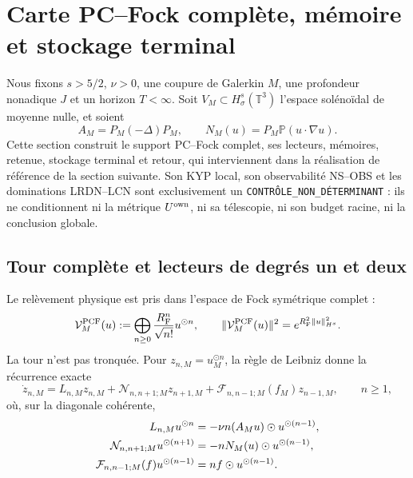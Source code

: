 \section{Carte PC--Fock complète, mémoire et stockage terminal}
\label{sec:ns-pcf-prospective-construction}

Nous fixons \(s>5/2\), \(\nu>0\), une coupure de Galerkin \(M\), une profondeur nonadique \(J\) et un horizon \(T<\infty\). Soit \(V_M\subset H^s_\sigma(\mathbb T^3)\) l'espace solénoïdal de moyenne nulle, et soient
\begin{equation}
 A_M=P_M(-\Delta)P_M,
 \qquad
 N_M(u)=P_M\mathbb P(u\cdot\nabla u).
 \label{eq:ns-import-galerkin-operators}
\end{equation}
Cette section construit le support PC--Fock complet, ses lecteurs, mémoires, retenue, stockage terminal et retour, qui interviennent dans la réalisation de référence de la section suivante. Son KYP local, son observabilité NS--OBS et les dominations LRDN--LCN sont exclusivement un \texttt{CONTRÔLE\_NON\_DÉTERMINANT} : ils ne conditionnent ni la métrique \(U^{\rm own}\), ni sa télescopie, ni son budget racine, ni la conclusion globale.

\subsection{Tour complète et lecteurs de degrés un et deux}

Le relèvement physique est pris dans l'espace de Fock symétrique complet :
\begin{equation}
 \mathcal V_M^{\rm PCF}(u)
 :=\bigoplus_{n\ge0}\frac{R_{\rm F}^n}{\sqrt{n!}}u^{\odot n},
 \qquad
 \|\mathcal V_M^{\rm PCF}(u)\|^2
 =e^{R_{\rm F}^2\|u\|_{H^s}^2}.
 \label{eq:ns-import-pcf-lift}
\end{equation}
La tour n'est pas tronquée. Pour \(z_{n,M}=u_M^{\odot n}\), la règle de Leibniz donne la récurrence exacte
\begin{equation}
 \dot z_{n,M}
 =L_{n,M}z_{n,M}
 +\mathcal N_{n,n+1;M}z_{n+1,M}
 +\mathcal F_{n,n-1;M}(f_M)z_{n-1,M},
 \qquad n\ge1,
 \label{eq:ns-import-carleman-all-degrees}
\end{equation}
où, sur la diagonale cohérente,
\begin{align}
 L_{n,M}u^{\odot n}
 &=-\nu n(A_Mu)\odot u^{\odot(n-1)}, \notag\\
 \mathcal N_{n,n+1;M}u^{\odot(n+1)}
 &=-nN_M(u)\odot u^{\odot(n-1)}, \notag\\
 \mathcal F_{n,n-1;M}(f)u^{\odot(n-1)}
 &=nf\odot u^{\odot(n-1)}.
 \label{eq:ns-import-carleman-blocks}
\end{align}

